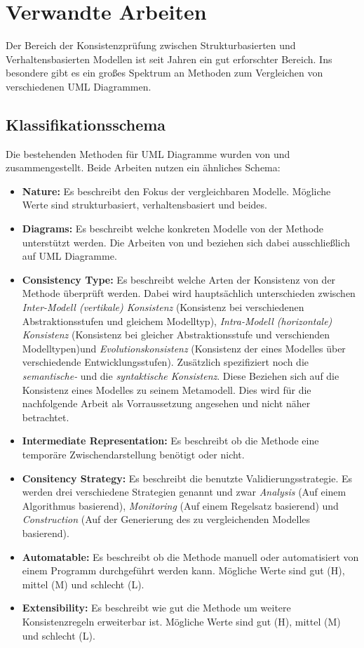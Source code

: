\chapter{Verwandte Arbeiten}

Der Bereich der Konsistenzprüfung zwischen Strukturbasierten und Verhaltensbasierten Modellen ist seit Jahren ein gut erforschter Bereich.
Ins besondere gibt es ein großes Spektrum an Methoden zum Vergleichen von verschiedenen UML Diagrammen.

\section{Klassifikationsschema}

Die bestehenden Methoden für UML Diagramme wurden von \cite{Usman2008} und \cite{Lucas2009} zusammengestellt.
Beide Arbeiten nutzen ein ähnliches Schema:

\begin{itemize}
    \item \textbf{Nature:} Es beschreibt den Fokus der vergleichbaren Modelle. Mögliche Werte sind strukturbasiert, verhaltensbasiert und beides.
    \item \textbf{Diagrams:} Es beschreibt welche konkreten Modelle von der Methode unterstützt werden. Die Arbeiten von \cite{Usman2008} und \cite{Lucas2009} beziehen sich dabei ausschließlich auf UML Diagramme.
    \item \textbf{Consistency Type:} Es beschreibt welche Arten der Konsistenz von der Methode überprüft werden. Dabei wird hauptsächlich unterschieden zwischen \emph{Inter-Modell (vertikale) Konsistenz} (Konsistenz bei verschiedenen Abstraktionsstufen und gleichem Modelltyp), \emph{Intra-Modell (horizontale) Konsistenz} (Konsistenz bei gleicher Abstraktionsstufe und verschienden Modelltypen)und \emph{Evolutionskonsistenz} (Konsistenz der eines Modelles über verschiedende Entwicklungsstufen). Zusätzlich spezifiziert \cite{Usman2008} noch die \emph{semantische-} und die \emph{syntaktische Konsistenz}. Diese Beziehen sich auf die Konsistenz eines Modelles zu seinem Metamodell. Dies wird für die nachfolgende Arbeit als Vorraussetzung angesehen und nicht näher betrachtet.
    \item \textbf{Intermediate Representation:} Es beschreibt ob die Methode eine temporäre Zwischendarstellung benötigt oder nicht.
    \item \textbf{Consitency Strategy:} Es beschreibt die benutzte Validierungsstrategie. Es werden drei verschiedene Strategien genannt und zwar \emph{Analysis} (Auf einem Algorithmus basierend), \emph{Monitoring} (Auf einem Regelsatz basierend) und \emph{Construction} (Auf der Generierung des zu vergleichenden Modelles basierend).
    \item \textbf{Automatable:} Es beschreibt ob die Methode manuell oder automatisiert von einem Programm durchgeführt werden kann. Mögliche Werte sind gut (H), mittel (M) und schlecht (L).
    \item \textbf{Extensibility:} Es beschreibt wie gut die Methode um weitere Konsistenzregeln erweiterbar ist. Mögliche Werte sind gut (H), mittel (M) und schlecht (L).
\end{itemize}

